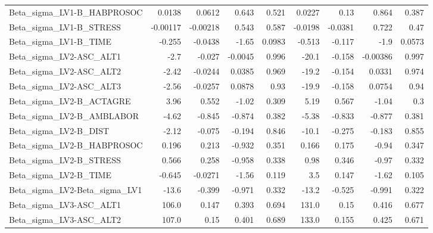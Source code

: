 \begin{tabular}{lrrrrrrrr}
Beta\_sigma\_LV1-B\_HABPROSOC    &      0.0138 &       0.0612 &   0.643 &    0.521 &     0.0227 &        0.13 &        0.864 &         0.387 \\
Beta\_sigma\_LV1-B\_STRESS       &    -0.00117 &     -0.00218 &   0.543 &    0.587 &    -0.0198 &     -0.0381 &        0.722 &          0.47 \\
Beta\_sigma\_LV1-B\_TIME         &      -0.255 &      -0.0438 &   -1.65 &   0.0983 &     -0.513 &      -0.117 &         -1.9 &        0.0573 \\
Beta\_sigma\_LV2-ASC\_ALT1       &        -2.7 &       -0.027 & -0.0045 &    0.996 &      -20.1 &      -0.158 &     -0.00386 &         0.997 \\
Beta\_sigma\_LV2-ASC\_ALT2       &       -2.42 &      -0.0244 &  0.0385 &    0.969 &      -19.2 &      -0.154 &       0.0331 &         0.974 \\
Beta\_sigma\_LV2-ASC\_ALT3       &       -2.56 &      -0.0257 &  0.0878 &     0.93 &      -19.9 &      -0.158 &       0.0754 &          0.94 \\
Beta\_sigma\_LV2-B\_ACTAGRE      &        3.96 &        0.552 &   -1.02 &    0.309 &       5.19 &       0.567 &        -1.04 &           0.3 \\
Beta\_sigma\_LV2-B\_AMBLABOR     &       -4.62 &       -0.845 &  -0.874 &    0.382 &      -5.38 &      -0.833 &       -0.877 &         0.381 \\
Beta\_sigma\_LV2-B\_DIST         &       -2.12 &       -0.075 &  -0.194 &    0.846 &      -10.1 &      -0.275 &       -0.183 &         0.855 \\
Beta\_sigma\_LV2-B\_HABPROSOC    &       0.196 &        0.213 &  -0.932 &    0.351 &      0.166 &       0.175 &        -0.94 &         0.347 \\
Beta\_sigma\_LV2-B\_STRESS       &       0.566 &        0.258 &  -0.958 &    0.338 &       0.98 &       0.346 &        -0.97 &         0.332 \\
Beta\_sigma\_LV2-B\_TIME         &      -0.645 &      -0.0271 &   -1.56 &    0.119 &        3.5 &       0.147 &        -1.62 &         0.105 \\
Beta\_sigma\_LV2-Beta\_sigma\_LV1 &       -13.6 &       -0.399 &  -0.971 &    0.332 &      -13.2 &      -0.525 &       -0.991 &         0.322 \\
Beta\_sigma\_LV3-ASC\_ALT1       &       106.0 &        0.147 &   0.393 &    0.694 &      131.0 &        0.15 &        0.416 &         0.677 \\
Beta\_sigma\_LV3-ASC\_ALT2       &       107.0 &         0.15 &   0.401 &    0.689 &      133.0 &       0.155 &        0.425 &         0.671 \\

\end{tabular}
